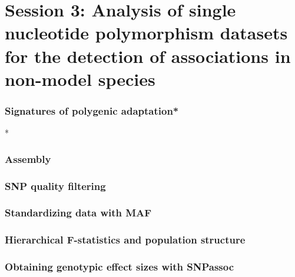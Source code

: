 
\section[Session 3]{Session 3: Analysis of single nucleotide polymorphism
datasets for the detection of associations in non-model species}

\begin{frame}
\frametitle{Signatures of polygenic adaptation*}

\begin{block}{}

\end{block}
\tiny
*\citet{Berg:2014bs}
\end{frame}

\begin{frame}
\frametitle{Assembly}
\end{frame}

\begin{frame}
\frametitle{SNP quality filtering}
\end{frame}

\begin{frame}
\frametitle{Standardizing data with MAF}
\tiny
\citet{Patterson:2006ki}
\end{frame}

\begin{frame}
\frametitle{Hierarchical F-statistics and population structure}
\end{frame}

\begin{frame}
\frametitle{Obtaining genotypic effect sizes with SNPassoc}
\end{frame}

